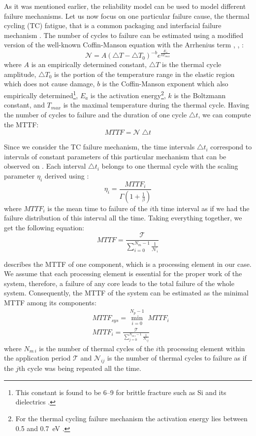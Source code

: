 As it was mentioned earlier, the reliability model can be used to model different failure mechanisms. Let us now focus on one particular failure cause, the thermal cycling (TC) fatigue, that is a common packaging and interfacial failure mechanism \cite{jedec2010}. The number of cycles to failure can be estimated using a modified version of the well-known Coffin-Manson equation with the Arrhenius term \cite{jedec2010}, \cite{xiang2010}, \cite{ciappa2003}:
\begin{equation} \label{eq:cycles-to-failure}
  \mathcal{N} = A (\triangle T - \triangle T_0)^{-b} e^{\frac{E_a}{k T_{max}}}
\end{equation}
where $A$ is an empirically determined constant, $\triangle T$ is the thermal cycle amplitude, $\triangle T_0$ is the portion of the temperature range in the elastic region which does not cause damage, $b$ is the Coffin-Manson exponent which also empirically determined\footnote{This constant is found to be 6--9 for brittle fracture such as Si and its dielectrics \cite{jedec2010}.}, $E_{a}$ is the activation energy\footnote{For the thermal cycling failure mechanism the activation energy lies between 0.5 and 0.7~eV \cite{vigrass}.}, $k$ is the Boltzmann constant, and $T_{max}$ is the maximal temperature during the thermal cycle. Having the number of cycles to failure and the duration of one cycle $\triangle t$, we can compute the MTTF:
\[
  MTTF = \mathcal{N} \; \triangle t
\]

Since we consider the TC failure mechanism, the time intervals $\triangle t_i$ correspond to intervals of constant parameters of this particular mechanism that can be observed on . Each interval $\triangle t_i$ belongs to one thermal cycle with the scaling parameter $\eta_i$ derived using :
\[
  \eta_i = \frac{MTTF_i}{\Gamma(1 + \frac{1}{\beta})}
\]
where $MTTF_i$ is the mean time to failure of the $i$th time interval as if we had the failure distribution of this interval all the time. Taking everything together, we get the following equation:
\begin{equation} \label{eq:one-mttf}
  MTTF = \frac{\mathcal{T}}{\sum_{i=0}^{N_m - 1} \frac{1}{\mathcal{N}_i}}
\end{equation}

 describes the MTTF of one component, which is a processing element in our case. We assume that each processing element is essential for the proper work of the system, therefore, a failure of any core leads to the total failure of the whole system. Consequently, the MTTF of the system can be estimated as the minimal MTTF among its components:
\begin{align*}
  & MTTF_{sys} = \min_{i=0}^{N_p - 1} \; MTTF_i \\
  & MTTF_i = \frac{\mathcal{T}}{\sum_{j=0}^{N_{m \: i} - 1} \frac{1}{\mathcal{N}_{ij}}}
\end{align*}
where $N_{m \: i}$ is the number of thermal cycles of the $i$th processing element within the application period $\mathcal{T}$ and $\mathcal{N}_{ij}$ is the number of thermal cycles to failure as if the $j$th cycle was being repeated all the time.

